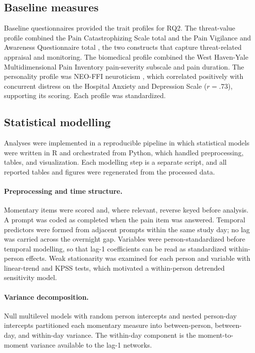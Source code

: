 \documentclass[11pt,a4paper]{article}
\begin{document}
\subsection{Baseline measures}
Baseline questionnaires provided the trait profiles for RQ2. The threat-value profile combined
the Pain Catastrophizing Scale total \citep{sullivan1995pain} and the Pain Vigilance and
Awareness Questionnaire total \citep{roelofs2003pvaq}, the two constructs that capture
threat-related appraisal and monitoring. The biomedical profile combined the West
Haven-Yale Multidimensional Pain Inventory pain-severity subscale \citep{kerns1985mpi} and pain
duration. The personality profile was NEO-FFI neuroticism \citep{costa1992neo}, which correlated
positively with concurrent distress on the Hospital Anxiety and Depression Scale ($r=.73$),
supporting its scoring. Each profile was standardized.

\subsection{Statistical modelling}
Analyses were implemented in a reproducible pipeline in which statistical models were written in
\textsf{R} \citep{rcoreteam2024} and orchestrated from \textsf{Python}, which handled
preprocessing, tables, and visualization. Each modelling step is a separate script, and all
reported tables and figures were regenerated from the processed data.

\paragraph{Preprocessing and time structure.} Momentary items were scored and, where relevant,
reverse keyed before analysis. A prompt was coded as completed when the pain item was answered.
Temporal predictors were formed from adjacent prompts within the same study day; no lag was
carried across the overnight gap. Variables were person-standardized before temporal modelling,
so that lag-1 coefficients can be read as standardized within-person effects. Weak stationarity
was examined for each person and variable with linear-trend and KPSS tests, which motivated a
within-person detrended sensitivity model.

\paragraph{Variance decomposition.} Null multilevel models with random person intercepts and
nested person-day intercepts \citep{bates2015lme4} partitioned each momentary measure into
between-person, between-day, and within-day variance. The within-day component is the
moment-to-moment variance available to the lag-1 networks.
\end{document}
